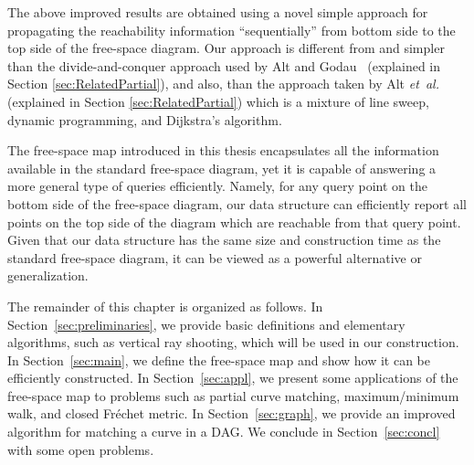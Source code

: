 \documentclass[12pt]{dalthesis}
\newcommand{\etal}{{\em et~al.\/}}
\newcommand{\REM}[1]{}
\newcommand{\Frechet}{Fr\'echet }
\newcommand{\fs}{free-space }
\begin{document}
\REM{
They also provided an
 time algorithm to compute the \Frechet distance between two
closed curves. Since then, different variants of the \Frechet distance have
been studied in the literature which are all based on constructing
a data structure called free space diagram, introduced by Alt and Godau~\cite{AltG95}.
We present a data structure on top of the free space diagram
that besides its simplicity, allows us to compute the \Frechet distance between
two closed curves,  time faster than the algorithm by Alt and
Godau. In addition, our data structure can be employed in several
applications related to partial curve matching.
}

The above improved results are obtained using a novel simple approach for
propagating the reachability information ``sequentially'' 
from bottom side to the top side of the \fs diagram.
Our approach is different from and simpler than the 
divide-and-conquer approach used by Alt and Godau~\cite{AltG95}
(explained in Section \ref{sec:RelatedPartial}),
and also, than the approach taken by Alt \etal~\cite{AltERW03a}
(explained in Section \ref{sec:RelatedPartial}) which is
a mixture of line sweep, dynamic programming, and Dijkstra's algorithm.


The \fs map introduced in this thesis
encapsulates all the information available in the
standard \fs diagram, yet
it is capable of answering a more general type of queries efficiently.
Namely, for any query point on the bottom side of the \fs diagram, 
our data structure can efficiently report all points on the top side of the diagram 
which are reachable from that query point.
Given that our data structure has the same
size and construction time as the standard \fs diagram, 
it can be viewed as a powerful alternative 
or generalization. 

\REM{
The current lower bound
for deciding whether the \Frechet distance
between two polygonal curves with total  vertices is at most a given value ,
is  \cite{LowerBound-FD}.
However, no subquadratic algorithm is known for this decision problem,
and hence, it is widely accepted that the actual lower bound 
for this problem is  (see e.g.~\cite{AltBook2009}).
If this holds, then the results
obtained in this thesis do not only represent improvements, 
but are also optimal.
}

The remainder of this chapter is organized as follows.
In Section~\ref{sec:preliminaries}, we provide basic definitions
and elementary algorithms, such as vertical ray shooting, 
which will be used in our construction. 
In Section~\ref{sec:main}, we define the \fs map and 
show how it can be efficiently constructed.
In Section~\ref{sec:appl}, we present some applications of the \fs map to problems
such as partial curve matching, maximum/minimum walk, and closed \Frechet metric.
In Section~\ref{sec:graph}, we provide an improved algorithm
for matching a curve in a DAG.
We conclude in Section~\ref{sec:concl} with some open problems.
\end{document}
